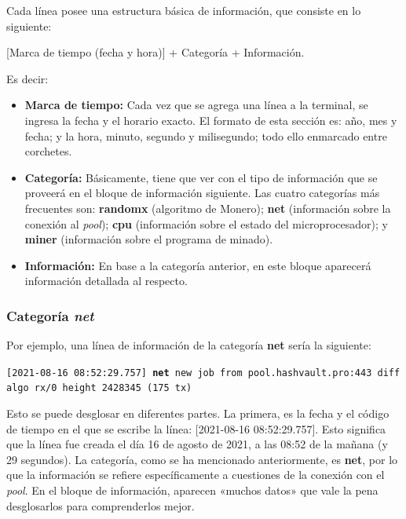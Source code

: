 \documentclass[12pt,a4paper,twoside]{book}
\begin{document}
Cada línea posee una estructura básica de información, que consiste en lo siguiente:

\begin{center}
[Marca de tiempo (fecha y hora)] + Categoría + Información.
\end{center}

Es decir:

\begin{itemize}
\item \textbf{Marca de tiempo:} Cada vez que se agrega una línea a la terminal, se ingresa la fecha y el horario exacto. El formato de esta sección es: año, mes y fecha; y la hora, minuto, segundo y milisegundo; todo ello enmarcado entre corchetes.
\item \textbf{Categoría:} Básicamente, tiene que ver con el tipo de información que se proveerá en el bloque de información siguiente. Las cuatro categorías más frecuentes son: \textbf{randomx} (algoritmo de Monero); \textbf{net} (información sobre la conexión al \textit{pool}); \textbf{cpu} (información sobre el estado del microprocesador); y \textbf{miner} (información sobre el programa de minado).
\item \textbf{Información:} En base a la categoría anterior, en este bloque aparecerá información detallada al respecto.
\end{itemize}

\subsubsection{Categoría \textit{net}}
Por ejemplo, una línea de información de la categoría \textbf{net} sería la siguiente:

{\footnotesize \texttt{[2021-08-16 08:52:29.757] \textbf{net} new job from pool.hashvault.pro:443 diff  algo rx/0 height 2428345 (175 tx)}}

Esto se puede desglosar en diferentes partes. La primera, es la fecha y el código de tiempo en el que se escribe la línea: [2021-08-16 08:52:29.757]. Esto significa que la línea fue creada el día 16 de agosto de 2021, a las 08:52 de la mañana (y 29 segundos). La categoría, como se ha mencionado anteriormente, es \textbf{net}, por lo que la información se refiere específicamente a cuestiones de la conexión con el \textit{pool}. En el bloque de información, aparecen «muchos datos» que vale la pena desglosarlos para comprenderlos mejor.
\end{document}

